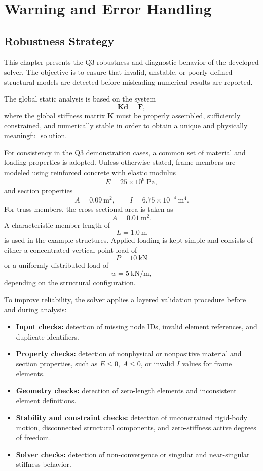 \chapter{Warning and Error Handling}

\section{Robustness Strategy}

This chapter presents the Q3 robustness and diagnostic behavior of the developed solver. The objective is to ensure that invalid, unstable, or poorly defined structural models are detected before misleading numerical results are reported.

The global static analysis is based on the system
\[
\mathbf{K}\mathbf{d}=\mathbf{F},
\]
where the global stiffness matrix $\mathbf{K}$ must be properly assembled, sufficiently constrained, and numerically stable in order to obtain a unique and physically meaningful solution.

For consistency in the Q3 demonstration cases, a common set of material and loading properties is adopted. Unless otherwise stated, frame members are modeled using reinforced concrete with elastic modulus
\[
E = 25 \times 10^{9}\ \text{Pa},
\]
and section properties
\[
A = 0.09\ \text{m}^2, \qquad I = 6.75 \times 10^{-4}\ \text{m}^4.
\]
For truss members, the cross-sectional area is taken as
\[
A = 0.01\ \text{m}^2.
\]
A characteristic member length of
\[
L = 1.0\ \text{m}
\]
is used in the example structures. Applied loading is kept simple and consists of either a concentrated vertical point load of
\[
P = 10\ \text{kN}
\]
or a uniformly distributed load of
\[
w = 5\ \text{kN/m},
\]
depending on the structural configuration.

To improve reliability, the solver applies a layered validation procedure before and during analysis:
\begin{itemize}
    \item \textbf{Input checks:} detection of missing node IDs, invalid element references, and duplicate identifiers.
    \item \textbf{Property checks:} detection of nonphysical or nonpositive material and section properties, such as $E \leq 0$, $A \leq 0$, or invalid $I$ values for frame elements.
    \item \textbf{Geometry checks:} detection of zero-length elements and inconsistent element definitions.
    \item \textbf{Stability and constraint checks:} detection of unconstrained rigid-body motion, disconnected structural components, and zero-stiffness active degrees of freedom.
    \item \textbf{Solver checks:} detection of non-convergence or singular and near-singular stiffness behavior.
\end{itemize}

